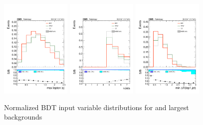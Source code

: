 \begin{figure}[htp]
\centering
\includegraphics[width=0.3\textwidth]{ch8_figs/kinMVA_input_max_Lep_eta.pdf}
\includegraphics[width=0.3\textwidth]{ch8_figs/kinMVA_input_numJets.pdf}
\includegraphics[width=0.3\textwidth]{ch8_figs/kinMVA_input_mindr_lep1_jet.pdf}
\caption[Signal extraction BDT input variables]{Normalized BDT input variable distributions for \tth and largest backgrounds}
\label{fig:inputs1}
\end{figure}

